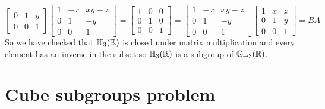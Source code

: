 \documentclass[11pt]{article}
\begin{document}
{$$\begin{bmatrix}
            0 & 1 & y \\
            0 & 0 & 1
        \end{bmatrix}
        \begin{bmatrix}
            1 & -x & xy-z \\
            0 & 1 & -y \\
            0 & 0 & 1
        \end{bmatrix}
        =
        \begin{bmatrix}
            1 & 0 & 0 \\
            0 & 1 & 0 \\
            0 & 0 & 1
        \end{bmatrix}
        =
        \begin{bmatrix}
            1 & -x & xy-z \\
            0 & 1 & -y \\
            0 & 0 & 1
        \end{bmatrix}
        \begin{bmatrix}
            1 & x & z \\
            0 & 1 & y \\
            0 & 0 & 1
        \end{bmatrix}
        = BA
        $$
        So we have checked that $\mathbb{H} _3 (\mathbb{R})$ is closed under matrix multiplication and every element has an inverse in the subset so $\mathbb{H} _3 (\mathbb{R})$ is a subgroup of $\mathbb{G}\mathbb{L} _3 (\mathbb{R})$.
    }


\newpage
\section*{Cube subgroups problem}
    \proof{

    }
\end{document}
